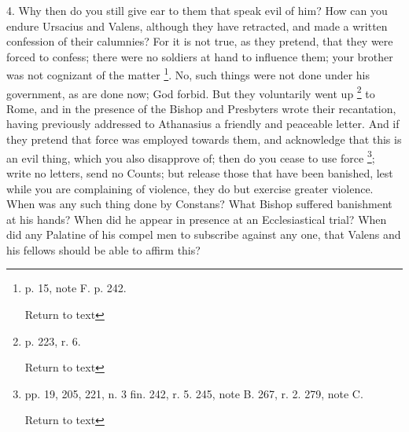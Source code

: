 4. Why then do you still give ear to them that
speak evil of him? How can you endure Ursacius and Valens, although
they have retracted, and made a written confession of their calumnies?
For it is not true, as they pretend, that they were forced to confess;
there were no soldiers at hand to influence them; your brother was not
cognizant of the matter \footnote{p. 15, note F. p. 242.

Return to text}.
No, such things were not done under his government, as are done now;
God forbid. But they voluntarily went up \footnote{p. 223, r. 6.

Return to text} to Rome, and in the presence of the Bishop and Presbyters
wrote their recantation, having previously addressed to Athanasius a
friendly and peaceable letter. And if they pretend that force was
employed towards them, and acknowledge that this is an evil thing,
which you also disapprove of; then do you cease to use force \footnote{pp. 19, 205, 221, n. 3 fin. 242, r. 5. 245, note B. 267, r. 2. 279,
note C.

Return to text}; write no letters, send no Counts; but release those that have
been banished, lest while you are complaining of violence, they
do but exercise greater violence. When was any such thing done by
Constans? What Bishop suffered banishment at his hands? When did he
appear in presence at an Ecclesiastical trial? When did any Palatine
of his compel men to subscribe against any one, that Valens and his
fellows should be able to affirm this?

